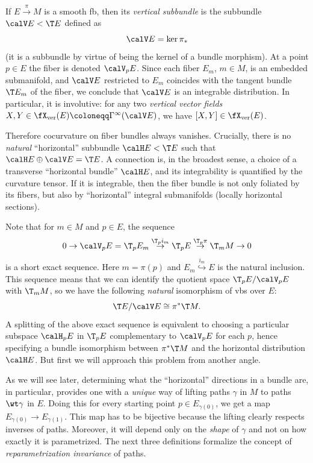 \begin{defn}
    If $E\overset{\pi}{\to}M$ is a smooth \gls{fb}, then its \emph{vertical subbundle} is the subbundle $\calV E< \T E$ defined as 
    \[\calV E=\ker \pi_\ast\]
    (it is a subbundle by virtue of being the kernel of a bundle morphism). At a point $p\in E$ the fiber is denoted $\calV_pE$. Since each fiber $E_m$, $m\in M$, is an embedded submanifold, and $\calV E$ restricted to $E_m$ coincides with the tangent bundle $\T E_m$ of the fiber, we conclude that $\calV E$ is an integrable distribution. In particular, it is involutive: for any two \emph{vertical vector fields} $X,Y\in \fX_{\mathrm{ver}}(E)\coloneqq\Gamma^\infty(\calV E)$, we have $[X,Y]\in \fX_{\mathrm{ver}}(E)$.
\end{defn}

Therefore cocurvature on fiber bundles always vanishes. Crucially, there is no \emph{natural} ``horizontal'' subbundle $\calH E<\T E$ such that $\calH E\oplus \calV E=\T E$. A connection is, in the broadest sense, a choice of a transverse ``horizontal bundle'' $\calH E$, and its integrability is quantified by the curvature tensor. If it is integrable, then the fiber bundle is not only foliated by its fibers, but also by ``horizontal''  integral submanifolds (locally horizontal sections).

Note that for $m\in M$ and $p\in E$, the sequence
\[0\to \calV_p E=\T_p E_m\overset{\T_p i_m}{\to}\T_p E\overset{\T_p\pi}{\to}\T_mM\to 0\]
is a short exact sequence. Here $m=\pi(p)$ and $E_m\overset{i_m}{\hookrightarrow} E$ is the natural inclusion. This sequence means that we can identify the quotient space $\T_pE\slash \calV_pE$ with $\T_mM$, so we have the following \emph{natural} isomorphism of \glspl{vb} over $E$:
\[\T E\slash \calV E\cong \pi^\ast \T M.\]
A splitting of the above exact sequence is equivalent to choosing a particular subspace $\calH_p E$ in $\T_p E$ complementary to $\calV_p E$ for each $p$, hence specifying a bundle isomorphism between $\pi^\ast \T M$ and the horizontal distribution $\calH E$. But first we will approach this problem from another angle.

As we will see later, determining what the ``horizontal'' directions in a bundle are, in particular, provides one with a \emph{unique} way of lifting paths $\gamma$ in $M$ to paths $\wt\gamma$ in $E$. Doing this for every starting point $p\in E_{\gamma(0)}$, we get a map $E_{\gamma(0)}\to E_{\gamma(1)}$. This map has to be bijective because the lifting clearly respects inverses of paths. Moreover, it will depend only on the \emph{shape} of $\gamma$ and not on how exactly it is parametrized. The next three definitions formalize the concept of \emph{reparametrization invariance} of paths.

